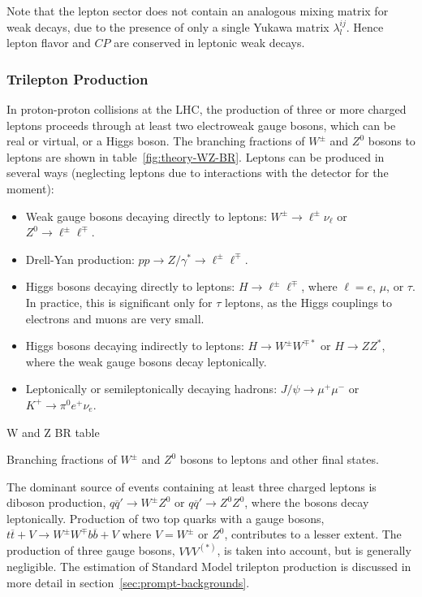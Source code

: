 Note that the lepton sector does not contain an analogous mixing matrix for weak decays, due to the presence of only a single Yukawa matrix $\lambda^{ij}_l$. Hence lepton flavor and $CP$ are conserved in leptonic weak decays.

\subsubsection{Trilepton Production}
In proton-proton collisions at the LHC, the production of three or more charged leptons proceeds through at least two electroweak gauge bosons, which can be real or virtual, or a Higgs boson. The branching fractions of $W^{\pm}$ and $Z^0$ bosons to leptons are shown in table~\ref{fig:theory-WZ-BR}. Leptons can be produced in several ways (neglecting leptons due to interactions with the detector for the moment):

\begin{itemize}
	\item Weak gauge bosons decaying directly to leptons: $W^{\pm}\rightarrow \ell^{\pm}\nu_{\ell}$ or $Z^0\rightarrow \ell^{\pm}\ell^{\mp}$.
	\item Drell-Yan production: $pp\rightarrow Z/\gamma^{*}\rightarrow\ell^{\pm}\ell^{\mp}$. 
	\item Higgs bosons decaying directly to leptons: $H\rightarrow \ell^{\pm}\ell^{\mp}$, where $\ell=e$, $\mu$, or $\tau$. In practice, this is significant only for $\tau$ leptons, as the Higgs couplings to electrons and muons are very small.
	\item Higgs bosons decaying indirectly to leptons: $H\rightarrow W^{\pm}W^{\mp*}$ or $H\rightarrow ZZ^{*}$, where the weak gauge bosons decay leptonically.
	\item Leptonically or semileptonically decaying hadrons: $J/\psi\rightarrow \mu^+\mu^-$ or $K^+\rightarrow \pi^0 e^+ \nu_{e}$. 
\end{itemize}

\begin{table}[htbp]
	\centering
	W and Z BR table
	\caption{Branching fractions of $W^{\pm}$ and $Z^0$ bosons to leptons and other final states.}
	\label{table:theory-WZ-BR}
\end{table}

The dominant source of events containing at least three charged leptons is diboson production, $q\overline{q}'\rightarrow W^{\pm}Z^0$ or $q\overline{q}'\rightarrow Z^0Z^0$, where the bosons decay leptonically. Production of two top quarks with a gauge bosons, $t\overline{t}+V\rightarrow W^{\pm}W^{\mp}b\overline{b}+V$ where $V=W^{\pm}$ or $Z^0$, contributes to a lesser extent. The production of three gauge bosons, $VVV^{(*)}$, is taken into account, but is generally negligible. The estimation of Standard Model trilepton production is discussed in more detail in section~\ref{sec:prompt-backgrounds}. 



